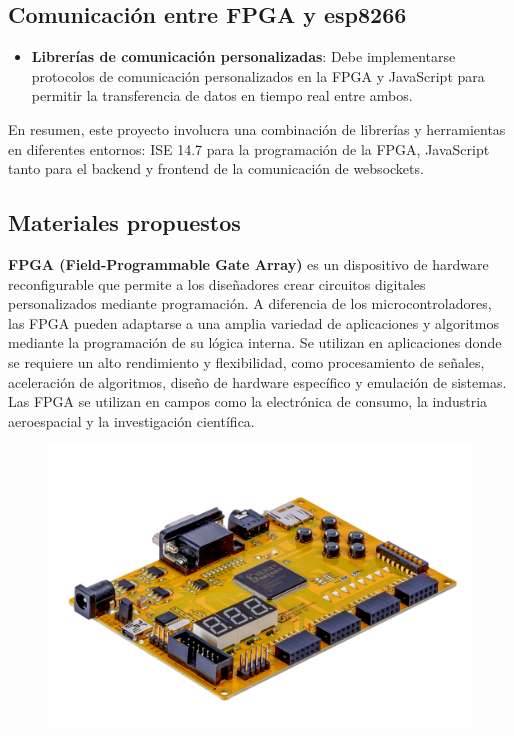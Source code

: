\documentclass[osajnl,twocolumn,showpacs,superscriptaddress,10pt]{revtex4-1}
\begin{document}
\subsection*{Comunicación entre FPGA y esp8266}

\begin{itemize}
  \item \textbf{Librerías de comunicación personalizadas}: Debe implementarse protocolos de comunicación personalizados en la FPGA y JavaScript para permitir la transferencia de datos en tiempo real entre ambos.
\end{itemize}



En resumen, este proyecto involucra una combinación de librerías y herramientas en diferentes entornos: ISE 14.7 para la programación de la FPGA, 
JavaScript tanto para el backend y frontend de la comunicación de websockets.

\subsection{Materiales propuestos}


\textbf{FPGA (Field-Programmable Gate Array) }es un dispositivo de hardware reconfigurable que permite a los diseñadores crear circuitos digitales personalizados mediante programación. A diferencia de los microcontroladores, las FPGA pueden adaptarse a una amplia variedad de aplicaciones y algoritmos mediante la programación de su lógica interna. Se utilizan en aplicaciones donde se requiere un alto rendimiento y flexibilidad, como procesamiento de señales, aceleración de algoritmos, diseño de hardware específico y emulación de sistemas. Las FPGA se utilizan en campos como la electrónica de consumo, la industria aeroespacial y la investigación científica.

\begin{figure}[H]
\begin{center}
    \includegraphics[scale=0.8]{images/ElbertV2_2-2-1-A.png}
    \end{center}
\end{figure}
\end{document}
